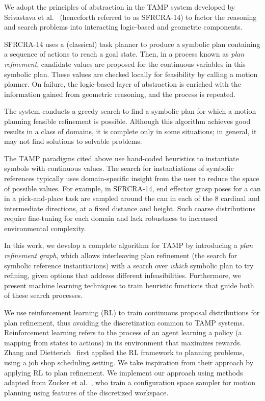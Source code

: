 We adopt the principles of abstraction in the TAMP system developed by Srivastava et
al.~\cite{srivastava2014combined} (henceforth referred to as SFRCRA-14) to factor the reasoning and
search problems into interacting logic-based and geometric components.

SFRCRA-14 uses a (classical) task planner to produce a symbolic plan containing
a sequence of actions to reach a goal state. Then, in a process known as \emph{plan refinement},
candidate values are proposed for the continuous variables in this symbolic plan.
These values are checked locally for feasibility by calling a motion planner.
On failure, the logic-based layer of abstraction is enriched with the
information gained from geometric reasoning, and the process is repeated.

The system conducts a greedy search to find a symbolic plan for which
a motion planning feasible refinement is possible. Although this algorithm achieves good results
in a class of domains, it is complete only in some situations; in
general, it may not find solutions to solvable problems.

The TAMP paradigms cited above use hand-coded
heuristics to instantiate symbols with continuous values.
The search for instantiations of symbolic
references typically uses domain-specific insight from the user to reduce
the space of possible values. For example, in SFRCRA-14,
end effector grasp poses for a can in a pick-and-place task are sampled around the can in
each of the 8 cardinal and intermediate directions, at a fixed
distance and height. Such coarse distributions require
fine-tuning for each domain and lack robustness to increased
environmental complexity.

In this work, we develop a complete algorithm for TAMP by introducing a \emph{plan refinement
graph}, which allows interleaving plan refinement (the search for symbolic
reference instantiations) with a search over \emph{which} symbolic plan to try refining, given options that address different
infeasibilities. Furthermore, we present machine learning techniques to train heuristic
functions that guide both of these search processes.

We use reinforcement learning (RL) to train continuous proposal distributions for
plan refinement, thus avoiding the discretization common to TAMP systems.
Reinforcement learning refers to the process of an agent learning a policy (a mapping from states to actions)
in its environment that maximizes rewards. Zhang and Dietterich~\cite{JobShopSched} first applied the RL framework
to planning problems, using a job shop scheduling setting. We take inspiration from
their approach by applying RL to plan refinement. We implement our approach using methods adapted from
Zucker et al.~\cite{workspacebias}, who train a configuration space sampler for motion planning
using features of the discretized workspace.

